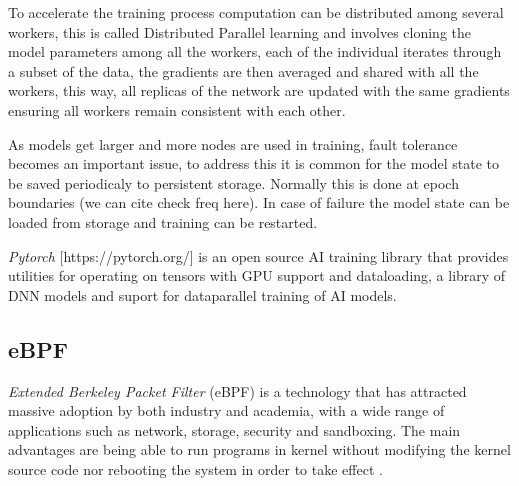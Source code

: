 \documentclass[conference]{IEEEtran}
\begin{document}
    To accelerate the training process computation can be distributed among several workers, this is called Distributed Parallel learning and involves cloning
    the model parameters among all the workers, each of the individual iterates through a subset of the data, the gradients are then averaged and shared with all the workers,
    this way, all replicas of the network are updated with the same gradients ensuring all workers remain consistent with each other.

    As models get larger and more nodes are used in training, fault tolerance becomes an important issue, to address this it is common for the model state to be
    saved periodicaly to persistent storage. Normally this is done at epoch boundaries (we can cite check freq here). In case of failure the model state can be loaded from
    storage and training can be restarted. 
    
    \textit{Pytorch} [https://pytorch.org/] is an open source AI training library that provides utilities for operating on tensors with GPU support and dataloading, a library of
    DNN models and suport for dataparallel training of AI models.

    \subsection{eBPF}

    \textit{Extended Berkeley Packet Filter} (eBPF) is a technology that has attracted massive adoption by both industry and academia, with a wide range of applications such as network, storage, security and sandboxing. 
    The main advantages are being able to run programs in kernel without modifying the kernel source code nor rebooting the system in order to take effect \cite{eBPFSurvey}.
\end{document}
